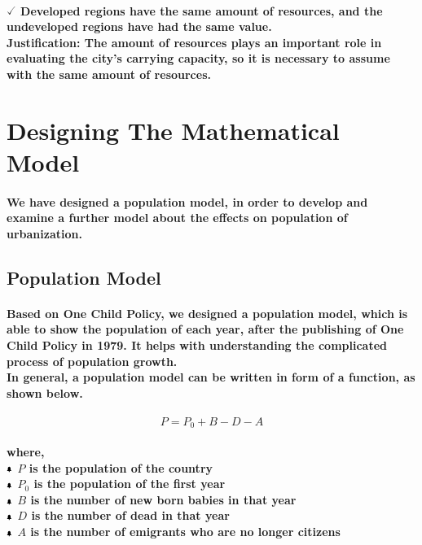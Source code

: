 \documentclass{article}
\begin{document}
\paragraph{$\checked$ Developed regions have the same amount of resources, and the undeveloped regions have had the same value. \\
Justification: The amount of resources plays an important role in evaluating the city's carrying capacity, so it is necessary to assume with the same amount of resources. }


\section{Designing The Mathematical Model}
\paragraph{We have designed a population model, in order to develop and examine a further model about the effects on population of urbanization.}

\subsection{Population Model}
\paragraph{Based on One Child Policy, we designed a population model, which is able to show the population of each year, after the publishing of One Child Policy in 1979. It helps with understanding the complicated process of population growth. \\
In general, a population model can be written in form of a function, as shown below.}
\paragraph{$$P=P_0 +B-D-A$$}
\paragraph{where, \\
$\bell$ $P$ is the population of the country\\
$\bell$ $P_0$ is the population of the first year \\
$\bell$ $B$ is the number of new born babies in that year\\
$\bell$ $D$ is the number of dead in that year\\
$\bell$ $A$ is the number of emigrants who are no longer citizens}
\end{document}
